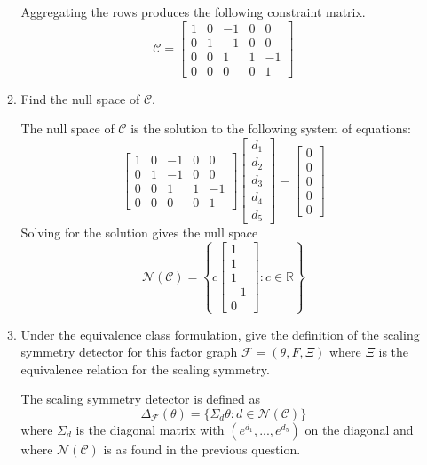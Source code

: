 \begin{enumerate}
\begin{enumerate}
\begin{solution}
Aggregating the rows produces the following constraint matrix.
\[
\mathcal{C} =
\begin{bmatrix}
1 & 0 & -1 & 0 & 0 \\
0 & 1 & -1 & 0 & 0 \\
0 & 0 & 1 & 1 & -1 \\
0 & 0 & 0 & 0 & 1
\end{bmatrix}
\]
\end{solution}

\item
Find the null space of $\mathcal{C}$.

\begin{solution}
The null space of $\mathcal{C}$ is the solution to the following system of equations:
\[
\begin{bmatrix}
1 & 0 & -1 & 0 & 0 \\
0 & 1 & -1 & 0 & 0 \\
0 & 0 & 1 & 1 & -1 \\
0 & 0 & 0 & 0 & 1
\end{bmatrix}
\begin{bmatrix}
d_1 \\ d_2 \\ d_3 \\ d_4 \\ d_5
\end{bmatrix}
=
\begin{bmatrix}
0 \\ 0 \\ 0 \\ 0 \\ 0
\end{bmatrix}
\]
Solving for the solution gives the null space
\[
\mathcal{N}(\mathcal{C}) = \left\{c
\begin{bmatrix}
1 \\ 1 \\ 1 \\ -1 \\ 0
\end{bmatrix}
: c\in\mathbb{R}
\right\}
\]
\end{solution}

\item
Under the equivalence class formulation, give the definition of the scaling symmetry detector for this factor graph $\mathcal{F}=(\theta,F,\Xi)$ where $\Xi$ is the equivalence relation for the scaling symmetry.

\begin{solution}
The scaling symmetry detector is defined as
\[
\Delta_\mathcal{F}(\theta) = \{\Sigma_d\theta:d\in\mathcal{N}(\mathcal{C})\}
\]
where $\Sigma_d$ is the diagonal matrix with $(e^{d_1},...,e^{d_5})$ on the diagonal and where $\mathcal{N}(\mathcal{C})$ is as found in the previous question. 
\end{solution}


\end{enumerate}
\end{enumerate}
